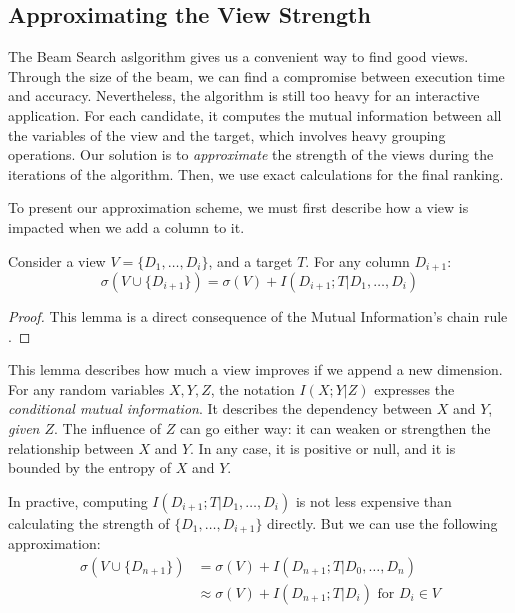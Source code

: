 \subsection{Approximating the View Strength}
\label{sec:approx}


The Beam Search aslgorithm gives us a convenient way to find good views.
Through the size of the beam, we can find a compromise between execution time
and accuracy.  Nevertheless, the algorithm is still too heavy for an
interactive application. For each candidate, it computes the mutual information
between all the variables of the view and the target, which involves heavy grouping
operations. Our solution is to \emph{approximate} the strength of the views
during the iterations of the algorithm. Then, we use exact calculations for the
final ranking.

To present our approximation scheme, we must first describe how a
view is impacted when we add a column to it.

\begin{lemma}\label{lem:chain}
Consider a view $V = \{D_1, \ldots, D_i\}$, and a target $T$.
For any column $D_{i+1}$: 
$$
\sigma(V \cup \{D_{i+1}\}) =  \sigma(V) + I(D_{i+1} ; T | D_1 , \ldots, D_i)
 $$
\end{lemma}
\begin{proof}
This lemma is a direct consequence of the Mutual Information's chain rule
\cite{cover2012elements}.
\end{proof}

This lemma describes how much a view improves if we append a new dimension.
For any random variables $X,Y,Z$, the notation $I(X;Y|Z)$ expresses the
\emph{conditional mutual information}. It describes the dependency between $X$
and $Y$, \emph{given $Z$}. The influence of $Z$ can go either way: it can
weaken or strengthen the relationship between $X$ and $Y$. In any case, it is
positive or null, and it is bounded by the entropy of $X$ and $Y$.

In practive, computing $ I(D_{i+1} ; T | D_1 , \ldots, D_i)$ is not less
expensive than calculating the strength of $\{D_1, \ldots, D_{i+1}\}$ directly.
But we can use the following approximation:
\[
\begin{split}
    \sigma(V \cup \{D_{n+1}\}) & = \sigma(V)   + I(D_{n+1} ; T | D_0, \ldots, D_{n})\\
                           & \approx \sigma(V) + I(D_{n+1} ; T | D_{i})
\text{ for } D_i \in V
\end{split}
\]

